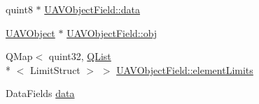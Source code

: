 \begin{DoxyCompactItemize}
\item 
quint8 $\ast$ \hyperlink{group___u_a_v_objects_plugin_gae6a068d71cfd70f70c7e6fb10f217ca5}{U\-A\-V\-Object\-Field\-::data}
\item 
\hyperlink{class_u_a_v_object}{U\-A\-V\-Object} $\ast$ \hyperlink{group___u_a_v_objects_plugin_ga750b9ade4270026bd2d02d37468597b5}{U\-A\-V\-Object\-Field\-::obj}
\item 
Q\-Map$<$ quint32, \hyperlink{class_q_list}{Q\-List}\\*
$<$ Limit\-Struct $>$ $>$ \hyperlink{group___u_a_v_objects_plugin_ga16abb7c1b891411815fe34473448b9ce}{U\-A\-V\-Object\-Field\-::element\-Limits}
\item 
Data\-Fields \hyperlink{group___u_a_v_objects_plugin_gae812e608461959ae131d5aca91d97434}{data}
\end{DoxyCompactItemize}
